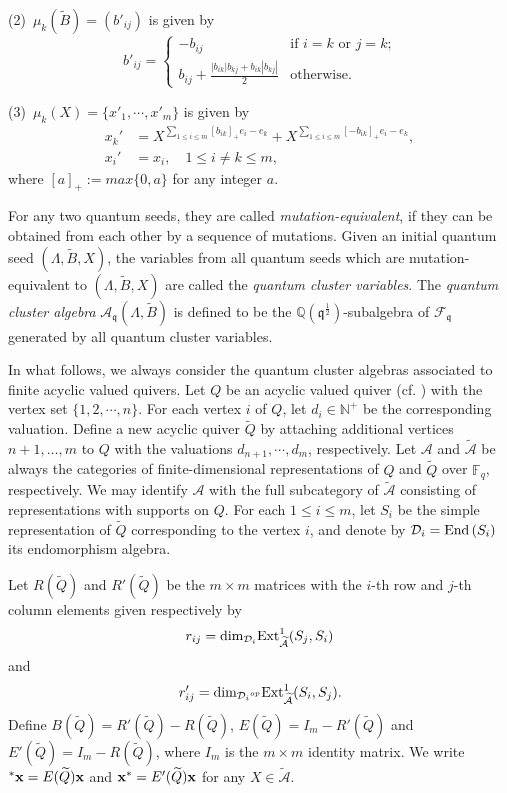 \documentclass[reqno,12pt]{amsart}
\numberwithin{equation}{section}
\def\Ext{\mbox{\rm Ext}} \def\Hom{\mbox{\rm Hom}} \def\dim{\mbox{\rm dim}} \def\Iso{\mbox{\rm Iso}\,}\def\Ind{\mbox{\rm Ind}\,}
\def\End{\mbox{\rm End}\,}\def\tw{\mbox{\rm tw}\,}\def\id{\mbox{\rm id}\,}
\def\x{{\bf x}}
\theoremstyle{plain} %
\theoremstyle{definition} %
\begin{document}
(2)\ $\mu_k(\widetilde{B})=(b'_{ij})$ is given by
\[b'_{ij}=\begin{cases}
-b_{ij} & \text{if $i=k$ or $j=k$;}\\
b_{ij}+\frac{|b_{ik}|b_{kj}+b_{ik}|b_{kj}|}{2} & \text{otherwise.}
\end{cases}
\]

(3)\  $\mu_k(X)=\{x'_1,\cdots,x'_m\}$ is given by
\begin{align}
x_k'&=X^{\sum_{1\leq i\leq m}[b_{ik}]_{+} {e}_i -{e}_k}+X^{\sum_{1\leq i\leq m}[-b_{ik}]_{+} {e}_i -{e}_k},\nonumber\\
x_i'&=x_i ,\quad 1\leq i\neq k\leq m,\nonumber
\end{align}
where $[a]_{+}:=max\{0,a\}$ for any integer $a$.

For any two quantum seeds, they are called
{\em mutation-equivalent}, if they can be obtained from each other
by a sequence of mutations. Given an initial quantum seed $(\Lambda, \widetilde{B}, X)$, the variables from all quantum seeds which are mutation-equivalent to $(\Lambda, \widetilde{B}, X)$ are called the {\em quantum cluster
variables}. The {\em quantum cluster algebra} $\mathcal{A}_{\mathfrak{q}}(\Lambda,\widetilde{B})$ is defined to be the
$\mathbb{Q}(\mathfrak{q}^{\frac{1}{2}})$-subalgebra of $\mathcal{F}_{\mathfrak{q}}$ generated by all
quantum cluster variables.

In what follows, we always consider the quantum cluster algebras associated to finite acyclic valued quivers.
Let $Q$ be an acyclic valued quiver (cf. \cite{Rupel1,Rupel2}) with the vertex set $\{1,2,\cdots,n\}$. For each vertex $i$ of $Q$, let $d_i\in\mathbb{N^+}$ be the corresponding valuation.
Define a new acyclic quiver $\widetilde{Q}$ by attaching additional vertices $n+1,\ldots,m$ to $Q$ with the valuations $d_{n+1},\cdots, d_m$, respectively.
Let $\mathcal{A}$ and $\widetilde{\mathcal{A}}$ be always the categories of finite-dimensional representations of $Q$ and $\widetilde{Q}$ over $\mathbb{F}_q$, respectively. We may identify $\mathcal{A}$ with the full subcategory of $\widetilde{\mathcal{A}}$ consisting of representations with supports on $Q$. For each $1\leq i\leq m$, let $S_i$ be the simple representation of $\widetilde{Q}$ corresponding to the vertex $i$, and denote by $\mathcal{D}_i=\End(S_i)$ its endomorphism algebra.

Let $R(\widetilde{Q})$ and $R'(\widetilde{Q})$ be the $m\times m$ matrices with the $i$-th row and $j$-th column elements given respectively by
$$r_{ij}=\dim_{\mathcal {D}_i}\Ext_{\widetilde{\mathcal{A}}}^1(S_j,S_i)$$
and
$$r'_{ij}=\dim_{{\mathcal {D}_i}^{op}}\Ext_{\widetilde{\mathcal{A}}}^1(S_i,S_j).$$
Define $B(\widetilde{Q})=R'(\widetilde{Q})-R(\widetilde{Q})$,
$E(\widetilde{Q})=I_{m}-R'(\widetilde{Q})$ and $E'(\widetilde{Q})=I_{m}-R(\widetilde{Q})$, where $I_{m}$ is the $m\times m$ identity matrix.
We write $^\ast\x=E(\widetilde{Q})\x$ and $\x^\ast=E'(\widetilde{Q})\x$ for any $X\in\widetilde{\mathcal{A}}$.
\end{document}
